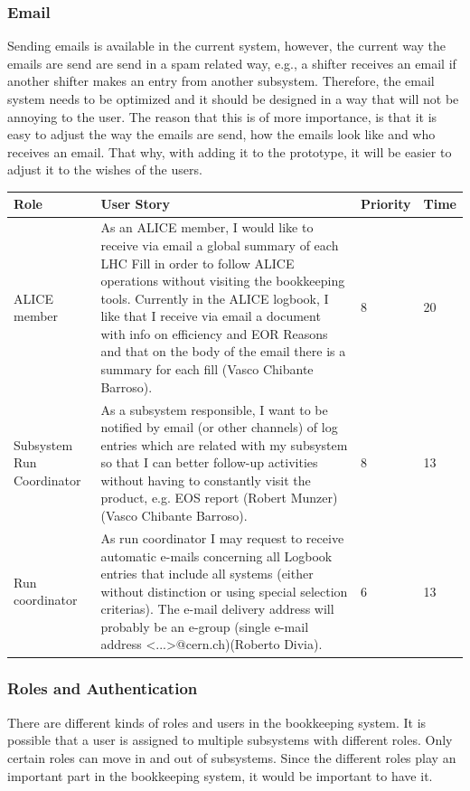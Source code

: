 \documentclass[paper=a4, fontsize=11pt,twoside]{scrartcl}	%
\begin{document}
\subsubsection{Email}
Sending emails is available in the current system, however, the current way the emails are send are send in a spam related way, e.g., a shifter receives an email if another shifter makes an entry from another subsystem. Therefore, the email system needs to be optimized and it should be designed in a way that will not be annoying to the user. The reason that this is of more importance, is that it is easy to adjust the way the emails are send, how the emails look like and who receives an email. That why, with adding it to the prototype, it will be easier to adjust it to the wishes of the users.
\begin{longtable}{ | p{3cm} | p{8cm} | p{1cm} | l |}
\hline
Role & User Story & Priority & Time \\ \hline
ALICE member & As an ALICE member, I would like to receive via email a global summary of each LHC Fill in order to follow ALICE operations without visiting the bookkeeping tools. Currently in the ALICE logbook, I like that I receive via email a document with info on efficiency and EOR Reasons and that on the body of the email there is a summary for
each fill (Vasco Chibante Barroso). & 8 & 20 \\ \hline
Subsystem Run Coordinator &  As a subsystem responsible, I want to be notified by email (or other
channels) of log entries which are related with my subsystem so that I can better follow-up activities without having to constantly visit the product, e.g. EOS report (Robert Munzer) (Vasco Chibante Barroso). & 8 & 13 \\ \hline
Run coordinator & As run coordinator I may request to receive automatic e-mails concerning all Logbook entries that include all systems (either without distinction or using special selection criterias). The e-mail delivery address will probably be an e-group (single e-mail address <...>@cern.ch)(Roberto Divia). & 6 & 13 \\ \hline
\end{longtable}

\subsubsection{Roles and Authentication}
There are different kinds of roles and users in the bookkeeping system. It is possible that a user is assigned to multiple subsystems with different roles. Only certain roles can move in and out of subsystems. Since the different roles play an important part in the bookkeeping system, it  would be important to have it.
\end{document}
